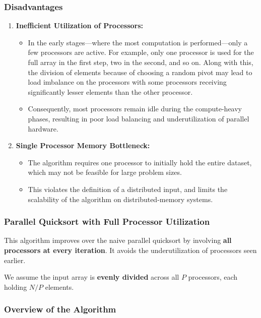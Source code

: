 \documentclass[12pt]{book}
\begin{document}
\subsubsection*{Disadvantages}

\begin{enumerate}
    \item \textbf{Inefficient Utilization of Processors:} 
    \begin{itemize}
        \item In the early stages—where the most computation is performed—only a few processors are active. For example, only one processor is used for the full array in the first step, two in the second, and so on. Along with this, the division of elements because of choosing a random pivot may lead to load imbalance on the processors with some processors receiving significantly lesser elements than the other processor.
        \item Consequently, most processors remain idle during the compute-heavy phases, resulting in poor load balancing and underutilization of parallel hardware.
    \end{itemize}

    \item \textbf{Single Processor Memory Bottleneck:}
    \begin{itemize}
        \item The algorithm requires one processor to initially hold the entire dataset, which may not be feasible for large problem sizes.
        \item This violates the definition of a distributed input, and limits the scalability of the algorithm on distributed-memory systems.
    \end{itemize}
\end{enumerate}

\subsubsection*{Parallel Quicksort with Full Processor Utilization}

This algorithm improves over the naive parallel quicksort by involving \textbf{all processors at every iteration}. It avoids the underutilization of processors seen earlier.

We assume the input array is \textbf{evenly divided} across all $P$ processors, each holding $N/P$ elements.

\subsubsection*{Overview of the Algorithm}
\end{document}
